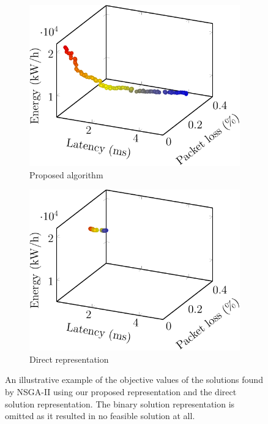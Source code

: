 \begin{figure}[t!]
    \centering
    \begin{subfigure}[b]{0.49\linewidth}
        \includegraphics[width=\textwidth]{graphs/comparison/qm-crop}
        \caption{Proposed algorithm}
    \end{subfigure}
    \begin{subfigure}[b]{0.49\linewidth}
        \includegraphics[width=\textwidth]{graphs/comparison/std-crop}
        \caption{Direct representation}
    \end{subfigure}

    \vspace{1em}
    \caption{An illustrative example of the objective values of the solutions found by NSGA-II using our proposed representation and the direct solution representation. The binary solution representation is omitted as it resulted in no feasible solution at all.}
    \label{fig:solution_representation_objectives}
\end{figure}


